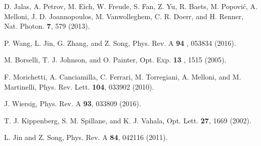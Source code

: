\documentclass[prl,showpacs,superscriptaddress,twocolumn]{revtex4-1}
\begin{document}
\begin{widetext}
\begin{thebibliography}{99}
 D. Jalas, A. Petrov, M. Eich, W. Freude, S. Fan, Z. Yu, R.
Baets, M. Popovi\'{c}, A. Melloni, J. D. Joannopoulos, M. Vanwolleghem, C.
R. Doerr, and H. Renner, Nat. Photon. \textbf{7}, 579 (2013).

 P. Wang, L. Jin, G. Zhang, and Z. Song, Phys. Rev. A \textbf{94}%
, 053834 (2016).

 M. Borselli, T. J. Johnson, and O. Painter, Opt. Exp. \textbf{13%
}, 1515 (2005).

 F. Morichetti, A. Canciamilla, C. Ferrari, M.
Torregiani, A. Melloni, and M. Martinelli, Phys. Rev. Lett. \textbf{104},
033902 (2010).

 J. Wiersig, Phys. Rev. A \textbf{93}, 033809 (2016).

 T. J. Kippenberg, S. M. Spillane, and K. J. Vahala, Opt. Lett.
\textbf{27}, 1669 (2002).

 L. Jin and Z. Song, Phys. Rev. A \textbf{84}, 042116 (2011).
\end{thebibliography}
\clearpage
\end{widetext}
\end{document}
